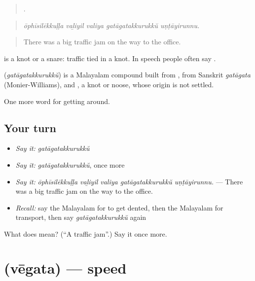 \begin{quote}
    .
\end{quote}

\begin{quote}
\emph{ōphīsilēkkuḷḷa vaḻiyil valiya gatāgatakkurukkŭ uṇṭāyirunnu.}
\end{quote}

\begin{quote}
There was a big traffic jam on the way to the office.
\end{quote}

 is a knot or a snare: traffic tied in a knot. In speech people often say .

\begin{cousinweb}
\textbf{} (\emph{gatāgatakkurukkŭ}) is a Malayalam compound built from , from Sanskrit \emph{gatāgata} (Monier-Williams), and , a knot or noose, whose origin is not settled.
\end{cousinweb}

\begin{grammarlens}[title={What you've built}]
One more word for getting around.
\end{grammarlens}

\subsection*{Your turn}
\begin{itemize}
\raggedright
  \item \emph{Say it:} \emph{gatāgatakkurukkŭ}
  \item \emph{Say it:} \emph{gatāgatakkurukkŭ}, once more
  \item \emph{Say it:} \emph{ōphīsilēkkuḷḷa vaḻiyil valiya gatāgatakkurukkŭ uṇṭāyirunnu.} — There was a big traffic jam on the way to the office.
  \item \emph{Recall:} say the Malayalam for to get dented, then the Malayalam for transport, then say \emph{gatāgatakkurukkŭ} again
\end{itemize}

\begin{tcolorbox}[breakable,colback=teal!4,colframe=teal!35!black,title={Before you move on}]
What does  mean? (\textquotedblleft{}A traffic jam\textquotedblright{}.) Say it once more.
\end{tcolorbox}
\section[\texorpdfstring{\ml{വേഗത} (vēgata)}{വേഗത (vēgata)}]{ (vēgata) — speed}

